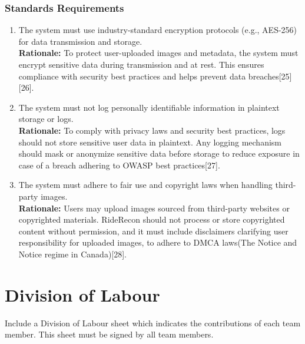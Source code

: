 \documentclass[]{article}
\begin{document}
\subsubsection{Standards Requirements}
\label{ssub:standards_requirements}
\begin{enumerate}[label={LR-STD\arabic*.}]
	\item The system must use industry-standard encryption protocols (e.g., AES-256) for data transmission and storage.\\
   \textbf{Rationale:} To protect user-uploaded images and metadata, the system must encrypt sensitive data during transmission and at rest. This ensures compliance with security best practices and helps prevent data breaches[25][26].
   \item The system must not log personally identifiable information in plaintext storage or logs.\\
   \textbf{Rationale:} To comply with privacy laws and security best practices, logs should not store sensitive user data in plaintext. Any logging mechanism should mask or anonymize sensitive data before storage to reduce exposure in case of a breach adhering to OWASP best practices[27].
   \item The system must adhere to fair use and copyright laws when handling third-party images.\\
   \textbf{Rationale:} Users may upload images sourced from third-party websites or copyrighted materials. RideRecon should not process or store copyrighted content without permission, and it must include disclaimers clarifying user responsibility for uploaded images, to adhere to DMCA laws(The Notice and Notice regime in Canada)[28].

\end{enumerate}


\appendix
\section{Division of Labour}
\label{sec:division_of_labour}
Include a Division of Labour sheet which indicates the contributions of each team member. This sheet must be signed by all team members.
\end{document}
